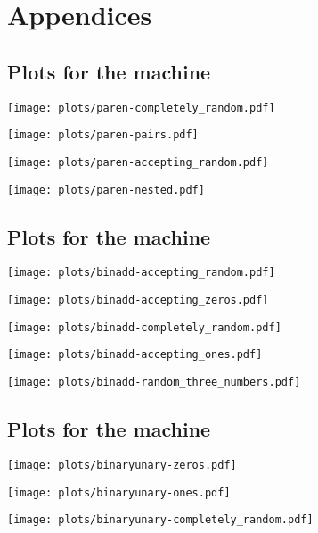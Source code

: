 \section{Appendices}
\subsection{Plots for the  machine}
\label{plots_paren}
\begin{center}\texttt{[image: plots/paren-completely\_random.pdf]}\end{center}
\begin{center}\texttt{[image: plots/paren-pairs.pdf]}\end{center}
\begin{center}\texttt{[image: plots/paren-accepting\_random.pdf]}\end{center}
\begin{center}\texttt{[image: plots/paren-nested.pdf]}\end{center}
\subsection{Plots for the  machine}
\label{plots_binadd}
\begin{center}\texttt{[image: plots/binadd-accepting\_random.pdf]}\end{center}
\begin{center}\texttt{[image: plots/binadd-accepting\_zeros.pdf]}\end{center}
\begin{center}\texttt{[image: plots/binadd-completely\_random.pdf]}\end{center}
\begin{center}\texttt{[image: plots/binadd-accepting\_ones.pdf]}\end{center}
\begin{center}\texttt{[image: plots/binadd-random\_three\_numbers.pdf]}\end{center}
\subsection{Plots for the  machine}
\label{plots_binaryunary}
\begin{center}\texttt{[image: plots/binaryunary-zeros.pdf]}\end{center}
\begin{center}\texttt{[image: plots/binaryunary-ones.pdf]}\end{center}
\begin{center}\texttt{[image: plots/binaryunary-completely\_random.pdf]}\end{center}
